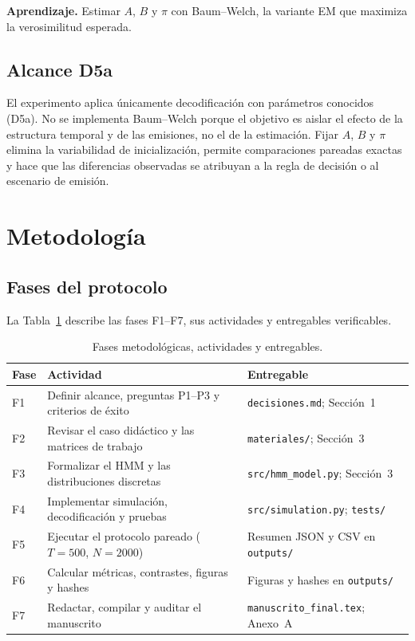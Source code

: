 \documentclass[11pt,letterpaper]{article}
\begin{document}
\textbf{Aprendizaje.} Estimar \(A\), \(B\) y \(\pi\) con Baum--Welch, la variante EM que maximiza la verosimilitud esperada.

\subsection{Alcance D5a}

El experimento aplica únicamente decodificación con parámetros conocidos (D5a). No se implementa Baum--Welch porque el objetivo es aislar el efecto de la estructura temporal y de las emisiones, no el de la estimación. Fijar \(A\), \(B\) y \(\pi\) elimina la variabilidad de inicialización, permite comparaciones pareadas exactas y hace que las diferencias observadas se atribuyan a la regla de decisión o al escenario de emisión.

\section{Metodología}

\subsection{Fases del protocolo}

La Tabla~\ref{tab:fases} describe las fases F1--F7, sus actividades y entregables verificables.

\begin{table}[H]
\centering
\caption{Fases metodológicas, actividades y entregables.}
\label{tab:fases}
\small
\begin{tabularx}{\textwidth}{@{}p{0.8cm}>{\raggedright\arraybackslash}X>{\raggedright\arraybackslash}p{5.8cm}@{}}
\toprule
Fase & Actividad & Entregable\\
\midrule
F1 & Definir alcance, preguntas P1--P3 y criterios de éxito & \texttt{decisiones.md}; Sección~1\\
F2 & Revisar el caso didáctico y las matrices de trabajo & \texttt{materiales/}; Sección~3\\
F3 & Formalizar el HMM y las distribuciones discretas & \texttt{src/hmm\_model.py}; Sección~3\\
F4 & Implementar simulación, decodificación y pruebas & \texttt{src/simulation.py}; \texttt{tests/}\\
F5 & Ejecutar el protocolo pareado (\(T=500\), \(N=2000\)) & Resumen JSON y CSV en \texttt{outputs/}\\
F6 & Calcular métricas, contrastes, figuras y hashes & Figuras y hashes en \texttt{outputs/}\\
F7 & Redactar, compilar y auditar el manuscrito & \texttt{manuscrito\_final.tex}; Anexo~A\\
\bottomrule
\end{tabularx}
\end{table}
\end{document}
